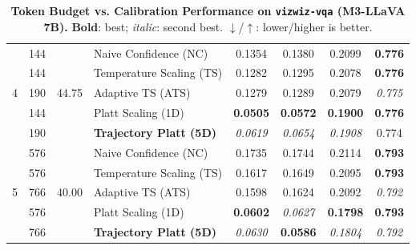 \begin{table}[t]
\begin{tabular}{ccclcccc}
\midrule
\multirow{5}{*}{4} & 144 & \multirow{5}{*}{44.75} & Naive Confidence (NC) & 0.1354 & 0.1380 & 0.2099 & \textbf{0.776} \\
 & 144 &  & Temperature Scaling (TS) & 0.1282 & 0.1295 & 0.2078 & \textbf{0.776} \\
 & 190 &  & Adaptive TS (ATS) & 0.1279 & 0.1289 & 0.2079 & \textit{0.775} \\
 & 144 &  & Platt Scaling (1D) & \textbf{0.0505} & \textbf{0.0572} & \textbf{0.1900} & \textbf{0.776} \\
 & 190 &  & \textbf{Trajectory Platt (5D)} & \textit{0.0619} & \textit{0.0654} & \textit{0.1908} & 0.774 \\
\midrule
\multirow{5}{*}{5} & 576 & \multirow{5}{*}{40.00} & Naive Confidence (NC) & 0.1735 & 0.1744 & 0.2114 & \textbf{0.793} \\
 & 576 &  & Temperature Scaling (TS) & 0.1617 & 0.1649 & 0.2095 & \textbf{0.793} \\
 & 766 &  & Adaptive TS (ATS) & 0.1598 & 0.1624 & 0.2092 & \textit{0.792} \\
 & 576 &  & Platt Scaling (1D) & \textbf{0.0602} & \textit{0.0627} & \textbf{0.1798} & \textbf{0.793} \\
 & 766 &  & \textbf{Trajectory Platt (5D)} & \textit{0.0630} & \textbf{0.0586} & \textit{0.1804} & \textit{0.792} \\
\bottomrule
\end{tabular}
\caption{\textbf{Token Budget vs. Calibration Performance on \texttt{vizwiz-vqa} (M3-LLaVA 7B).} \textbf{Bold}: best; \textit{italic}: second best. $\downarrow$/$\uparrow$: lower/higher is better.}
\label{tab:token_budget_vizwiz_vqa_m3}
\end{table}

